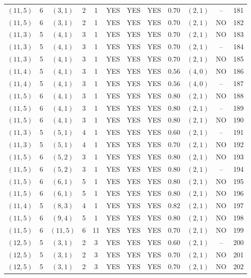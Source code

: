 \begin{longtable}{|c|c|c|c|c|c|c|c|c|c|c|c|}
$(11,5)$ & 6 & $(3,1)$ & 2 & 1 & YES & YES & YES & $0.70$ & $(2,1)$ & -- & 181\\
$(11,5)$ & 6 & $(3,1)$ & 2 & 1 & YES & YES & YES & $0.70$ & $(2,1)$ & NO & 182\\
$(11,3)$ & 5 & $(4,1)$ & 3 & 1 & YES & YES & YES & $0.70$ & $(2,1)$ & NO & 183\\
$(11,3)$ & 5 & $(4,1)$ & 3 & 1 & YES & YES & YES & $0.70$ & $(2,1)$ & -- & 184\\
$(11,3)$ & 5 & $(4,1)$ & 3 & 1 & YES & YES & YES & $0.70$ & $(2,1)$ & NO & 185\\
$(11,4)$ & 5 & $(4,1)$ & 3 & 1 & YES & YES & YES & $0.56$ & $(4,0)$ & NO & 186\\
$(11,4)$ & 5 & $(4,1)$ & 3 & 1 & YES & YES & YES & $0.56$ & $(4,0)$ & -- & 187\\
$(11,5)$ & 6 & $(4,1)$ & 3 & 1 & YES & YES & YES & $0.80$ & $(2,1)$ & NO & 188\\
$(11,5)$ & 6 & $(4,1)$ & 3 & 1 & YES & YES & YES & $0.80$ & $(2,1)$ & -- & 189\\
$(11,5)$ & 6 & $(4,1)$ & 3 & 1 & YES & YES & YES & $0.80$ & $(2,1)$ & NO & 190\\
$(11,3)$ & 5 & $(5,1)$ & 4 & 1 & YES & YES & YES & $0.60$ & $(2,1)$ & -- & 191\\
$(11,3)$ & 5 & $(5,1)$ & 4 & 1 & YES & YES & YES & $0.70$ & $(2,1)$ & NO & 192\\
$(11,5)$ & 6 & $(5,2)$ & 3 & 1 & YES & YES & YES & $0.80$ & $(2,1)$ & NO & 193\\
$(11,5)$ & 6 & $(5,2)$ & 3 & 1 & YES & YES & YES & $0.80$ & $(2,1)$ & -- & 194\\
$(11,5)$ & 6 & $(6,1)$ & 5 & 1 & YES & YES & YES & $0.80$ & $(2,1)$ & NO & 195\\
$(11,5)$ & 6 & $(6,1)$ & 5 & 1 & YES & YES & YES & $0.80$ & $(2,1)$ & NO & 196\\
$(11,4)$ & 5 & $(8,3)$ & 4 & 1 & YES & YES & YES & $0.82$ & $(2,1)$ & NO & 197\\
$(11,5)$ & 6 & $(9,4)$ & 5 & 1 & YES & YES & YES & $0.80$ & $(2,1)$ & NO & 198\\
$(11,5)$ & 6 & $(11,5)$ & 6 & 11 & YES & YES & YES & $0.70$ & $(2,1)$ & NO & 199\\
$(12,5)$ & 5 & $(3,1)$ & 2 & 3 & YES & YES & YES & $0.60$ & $(2,1)$ & -- & 200\\
$(12,5)$ & 5 & $(3,1)$ & 2 & 3 & YES & YES & YES & $0.70$ & $(2,1)$ & NO & 201\\
$(12,5)$ & 5 & $(3,1)$ & 2 & 3 & YES & YES & YES & $0.70$ & $(2,1)$ & NO & 202\\

\end{longtable}
